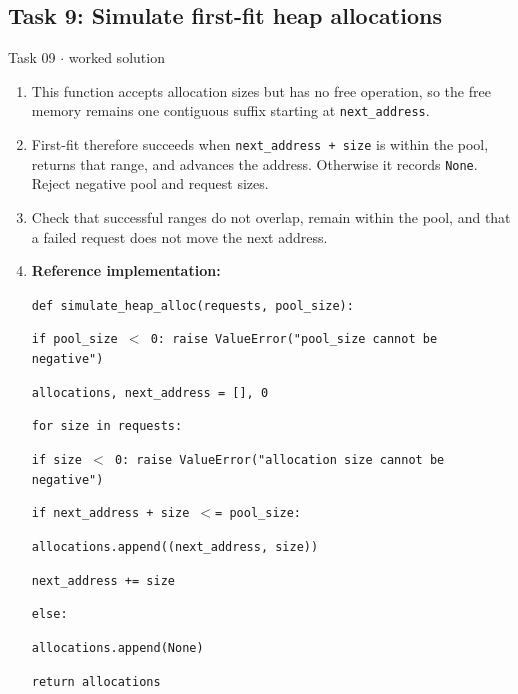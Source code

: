 \documentclass[11pt]{article}
\begin{document}
\begin{keepsection}\subsection{Task 9: Simulate first-fit heap allocations}

\begin{workedbox}{Task 09 \ensuremath{\cdot} worked solution}
\begin{enumerate}
\item This function accepts allocation sizes but has no free operation, so the free memory remains one contiguous suffix starting at \texttt{next\_address}.
\item First-fit therefore succeeds when \texttt{next\_address + size} is within the pool, returns that range, and advances the address. Otherwise it records \texttt{None}. Reject negative pool and request sizes.
\item Check that successful ranges do not overlap, remain within the pool, and that a failed request does not move the next address.
\item {}
\textbf{Reference implementation:}
\begin{tcolorbox}[colback=Paperblue,colframe=Paperblue,boxrule=0pt,arc=0pt,left=7pt,right=7pt,top=5pt,bottom=5pt]\small\sloppy
\noindent\hspace*{0em}\texttt{def simulate\_heap\_alloc(requests, pool\_size):}\par
\noindent\hspace*{1em}\texttt{if pool\_size \ensuremath{<} 0: raise ValueError("pool\_size cannot be negative")}\par
\noindent\hspace*{1em}\texttt{allocations, next\_address = [], 0}\par
\noindent\hspace*{1em}\texttt{for size in requests:}\par
\noindent\hspace*{3em}\texttt{if size \ensuremath{<} 0: raise ValueError("allocation size cannot be negative")}\par
\noindent\hspace*{3em}\texttt{if next\_address + size \ensuremath{<}= pool\_size:}\par
\noindent\hspace*{5em}\texttt{allocations.append((next\_address, size))}\par
\noindent\hspace*{5em}\texttt{next\_address += size}\par
\noindent\hspace*{3em}\texttt{else:}\par
\noindent\hspace*{5em}\texttt{allocations.append(None)}\par
\noindent\hspace*{1em}\texttt{return allocations}\par
\end{tcolorbox}
\end{enumerate}
\end{workedbox}

\end{keepsection}
\end{document}
